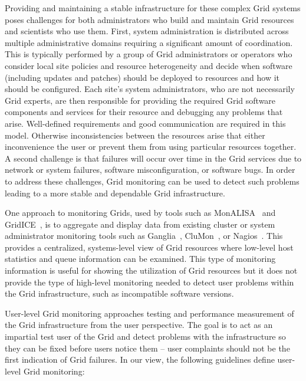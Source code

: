 \documentclass[times,10pt,twocolumn]{article}
\begin{document}
Providing and maintaining a stable infrastructure for these complex 
Grid systems poses challenges for both administrators who build and
maintain Grid resources and scientists who use them.  First, system
administration is distributed across multiple administrative domains 
requiring a significant amount of coordination.  This is typically performed by
a group of Grid administrators or operators who consider local site policies and
resource heterogeneity
and decide when software (including updates and patches) should be deployed to
resources and how it should be configured.  
Each site's system administrators, who are not necessarily Grid
experts, are then responsible for providing the required Grid software
components and services for their resource and debugging any problems that
arise.  Well-defined requirements and good communication are required in this
model.  Otherwise inconsistencies between the resources arise that either
inconvenience the user or prevent them from using particular resources
together.  A second challenge is that failures will occur over
time in the Grid services due to network or system failures, software
misconfiguration, or software bugs.  In order to address these challenges,
Grid monitoring can be used to detect such problems leading to a more
stable and dependable Grid infrastructure.

One approach to monitoring Grids, used by tools such as
MonALISA~\cite{monalisa} and GridICE~\cite{gridice}, is to aggregate and
display data from existing cluster or system administrator monitoring tools
such as Ganglia~\cite{ganglia}, CluMon~\cite{clumon}, or
Nagios~\cite{nagios}.  This provides a centralized, systems-level view of Grid
resources where low-level host statistics and queue information can be
examined.  This type of monitoring information is useful for showing the
utilization of Grid resources but it does not provide the type of
high-level monitoring needed to detect user problems within the Grid
infrastructure, such as incompatible software versions.  

User-level Grid monitoring approaches testing and performance measurement of
the Grid infrastructure from the user perspective.  The goal is to act as an
impartial test user of the Grid and detect problems with the infrastructure so
they can be fixed before users notice them -- user complaints should not be
the first indication of Grid failures.  In our view, the following guidelines 
define user-level Grid monitoring: 
\end{document}
